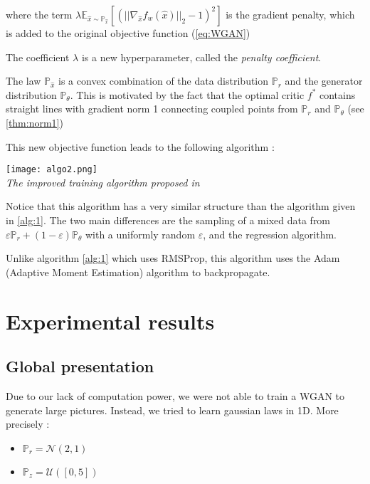\documentclass[a4paper]{article}
\newcommand{\Expec}{\mathbb{E}}
\newcommand{\Prob}{\mathbb{P}}
\theoremstyle{plain}
\theoremstyle{remark}
\theoremstyle{definition}
\begin{document}
where the term $\lambda
 \Expec_{\hat{x} \sim \Prob_{\hat{x}}} [ (||\nabla_{\hat{x}} f_w(\hat{x})||_2 -1)^2]$ is the gradient penalty, which is added to the original objective function (\ref{eq:WGAN})

The coefficient $\lambda$ is a new hyperparameter, called the \textit{penalty coefficient}.

The law $\Prob_{\hat{x}}$ is a convex combination of the data distribution $\Prob_r$ and the generator distribution $\Prob_\theta$. This is motivated by the fact that the optimal critic $f^*$ contains straight lines with gradient norm 1 connecting coupled points from $\Prob_r$ and $\Prob_\theta$ (see \ref{thm:norm1})

This new objective function leads to the following algorithm :

\begin{center}
	\label{alg:2}
	\texttt{[image: algo2.png]} \\
    \emph{The improved training algorithm proposed in \cite{gulrajani2017improved}}
\end{center}

Notice that this algorithm has a very similar structure than the algorithm given in \ref{alg:1}.
The two main differences are the sampling of a mixed data from $\varepsilon \Prob_r + (1-\varepsilon) \Prob_\theta$ with a uniformly random $\varepsilon$, and the regression algorithm.

Unlike algorithm \ref{alg:1} which uses RMSProp, this algorithm uses the Adam (Adaptive Moment Estimation) algorithm to backpropagate.

\section{Experimental results}
\label{chap:exp}

\subsection{Global presentation}

Due to our lack of computation power, we were not able to train a WGAN to generate large pictures. Instead, we tried to learn gaussian laws in 1D. More precisely :

\begin{itemize}
\item $\Prob_r = \mathcal{N}(2,1)$
\item $\Prob_z = \mathcal{U}([0,5])$
\end{itemize}
\end{document}
